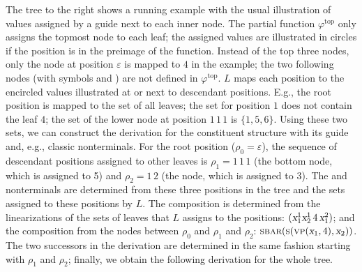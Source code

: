 \documentclass[../../document.tex]{subfiles}
\begin{document}
    \begin{wrapfigure}[8]{r}{0pt}
        
    \end{wrapfigure}
    \parexample\label{ex:extraction:head}
    The tree to the right shows a running example with the usual illustration of values assigned by a guide next to each inner node.
    The partial function \(\varphi^{\text{top}}\) only assigns the topmost node to each leaf; the assigned values are illustrated in circles if the position is in the preimage of the function.
    Instead of the top three nodes, only the  node at position \(\varepsilon\) is mapped to \(4\) in the example; the two following nodes (with symbols  and ) are not defined in \(\varphi^{\text{top}}\).
    \(L\) maps each position to the encircled values illustrated at or next to descendant positions.
    E.g., the root position is mapped to the set of all leaves;
      the set for position \(1\) does not contain the leaf $4$;
      the set of the lower  node at position \(1\,1\,1\) is \(\{1,5,6\}\).
    Using these two sets, we can construct the derivation for the constituent structure with its guide and, e.g., classic nonterminals.
    For the root position (\(\rho_0 = \varepsilon\)), the sequence of descendant positions assigned to other leaves is \(\rho_1 = 1\,1\,1\) (the bottom  node, which is assigned to 5) and \(\rho_2 = 1\,2\) (the  node, which is assigned to 3).
    The  and  nonterminals are determined from these three positions in the tree and the sets assigned to these positions by \(L\).
    The  composition is determined from the linearizations of the sets of leaves that \(L\) assigns to the positions: \((\textsl{x}_1^1\textsl{x}_2^1\,4\,\textsl{x}_1^2)\); and the  composition from the nodes between \(\rho_0\) and \(\rho_1\) and \(\rho_2\): \(\textsc{sbar}(\textsc{s}(\textsc{vp}(\textsl{x}_1, 4), \textsl{x}_2))\).
    The two successors in the derivation are determined in the same fashion starting with \(\rho_1\) and \(\rho_2\); finally, we obtain the following derivation for the whole tree.
    \begin{center}
        
    \end{center}
    \exampleqed
\end{document}
